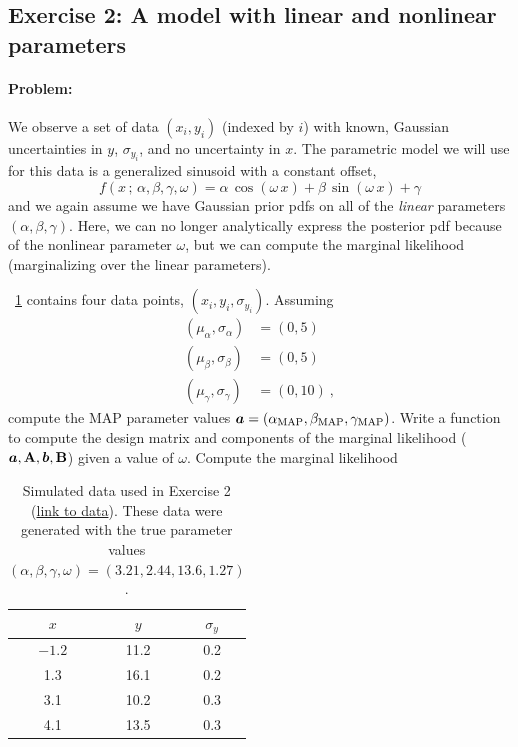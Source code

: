 \subsection{Exercise 2: A model with linear and nonlinear parameters}

\paragraph{Problem:} We observe a set of data $(x_i, y_i)$ (indexed by $i$) with
known, Gaussian uncertainties in $y$, $\sigma_{y_i}$, and no uncertainty in $x$.
The parametric model we will use for this data is a generalized sinusoid with a
constant offset,
\begin{equation}
  f(x \,;\, \alpha, \beta, \gamma, \omega) =
    \alpha\,\cos(\omega \, x) + \beta\,\sin(\omega \, x) + \gamma
\end{equation}
and we again assume we have Gaussian prior pdfs on all of the \emph{linear}
parameters $(\alpha, \beta, \gamma)$.
Here, we can no longer analytically express the posterior pdf because of the
nonlinear parameter $\omega$, but we can compute the marginal likelihood
(marginalizing over the linear parameters).

\tablename~\ref{tbl:data2} contains four data points, $(x_i, y_i,
\sigma_{y_i})$.
Assuming
\begin{align}
  (\mu_\alpha, \sigma_\alpha) &= (0, 5)\\
  (\mu_\beta, \sigma_\beta) &= (0, 5)\\
  (\mu_\gamma, \sigma_\gamma) &= (0, 10) ~ ,
\end{align}
compute the MAP parameter values $\boldsymbol{a} = (\alpha_{\rm MAP}, \beta_{\rm MAP},
\gamma_{\rm MAP})$.
Write a function to compute the design matrix and components of the marginal
likelihood ($\boldsymbol{a}, \mathbf{A}, \boldsymbol{b}, \mathbf{B}$) given a value of $\omega$.
Compute the marginal likelihood

\begin{table}[t!]
  \footnotesize
  \begin{center}
    \begin{tabular}{c|c|c}
      $x$ & $y$ & $\sigma_y$ \\
      \hline
      $-1.2$ & 11.2 & 0.2 \\
      1.3 & 16.1 & 0.2 \\
      3.1 & 10.2 & 0.3 \\
      4.1 & 13.5 & 0.3
    \end{tabular}
    \caption{Simulated data used in Exercise 2
    (\href{https://raw.githubusercontent.com/davidwhogg/GaussianProductRefactor/master/notebooks/data2.csv}{link to data}). These data were generated with the true parameter values $(\alpha, \beta, \gamma, \omega) = (3.21, 2.44, 13.6, 1.27)$.
    \label{tbl:data2}}
  \end{center}
\end{table}

